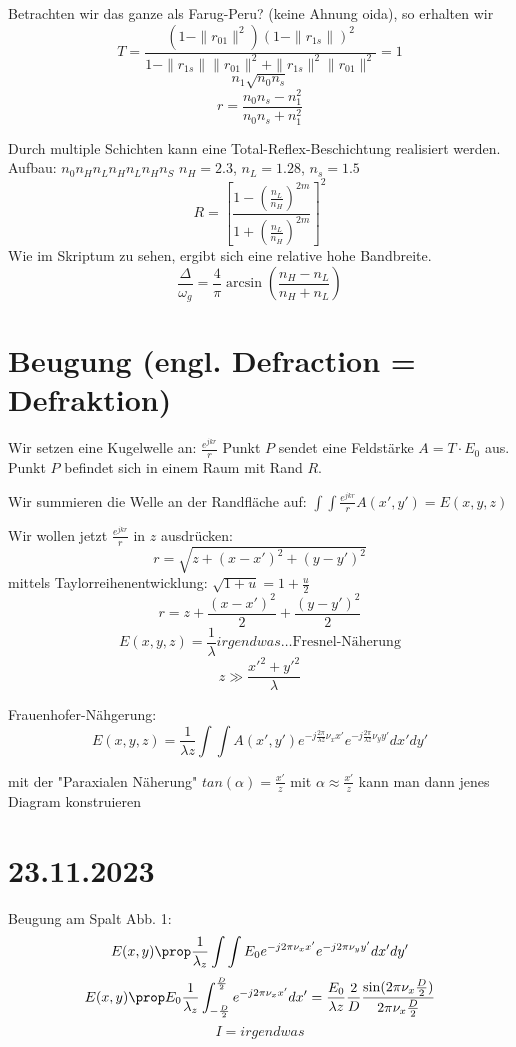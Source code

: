 \documentclass[a4paper]{article}
\begin{document}
Betrachten wir das ganze als Farug-Peru? (keine Ahnung oida), so erhalten wir
\[ T=\frac{(1-\|r_{01}\|^{2})(1-\|r_{1s}\|)^{2}}{1-\|r_{1s}\|\|r_{01}\|^{2}+\|r_{1s}\|^{2}\|r_{01}\|^{2}}=1 \]
\[ n_{1}\sqrt{n_{0}n_{s}}  \]
\[ r=\frac{n_{0}n_{s}-n_{1}^{2}}{n_{0}n_{s}+n_{1}^{2}} \]

Durch multiple Schichten kann eine Total-Reflex-Beschichtung realisiert werden.
Aufbau: $n_{0}n_{H}n_{L}n_{H}n_{L}n_{H}n_{S}$ 
$n_{H}=2.3$, $n_{L}=1.28$, $n_{s}=1.5$
\[ R=[\frac{1-(\frac{n_{L}}{n_{H}})^{2m}}{1+(\frac{n_{L}}{n_{H}})^{2m}}]^{2} \]
Wie im Skriptum zu sehen, ergibt sich eine relative hohe Bandbreite.
\[ \frac{\Delta}{\omega_{g}}=\frac{4}{\pi}\arcsin(\frac{n_{H}-n_{L}}{n_{H}+n_{L}}) \]

\section*{Beugung (engl. Defraction = Defraktion)}
Wir setzen eine Kugelwelle an: $\frac{e^{jkr}}{r}$ 
Punkt $P$ sendet eine Feldstärke $A=T\cdot E_{0}$ aus. Punkt $P$ befindet sich in einem Raum mit Rand  $R$.

Wir summieren die Welle an der Randfläche auf: $\int\int \frac{e^{jkr}}{r}A(x',y')=E(x,y,z)$

Wir wollen jetzt $\frac{e^{jkr}}{r}$ in $z$ ausdrücken:
\[ r=\sqrt{z +(x-x')^{2} + (y-y')^{2}} \]
mittels Taylorreihenentwicklung: $\sqrt{1+u}=1+\frac{u}{2} $
 \[ r=z+\frac{(x-x')^{2}}{2}+\frac{(y-y')^{2}}{2} \]
 \[ E(x,y,z)=\frac{1}{\lambda} irgendwas \text{\ldots Fresnel-Näherung} \]
\[ z\gg \frac{x'^{2}+y'^{2}}{\lambda} \]

Frauenhofer-Nähgerung:
\[ E(x,y,z)=\frac{1}{\lambda z} \int \int A(x',y')e^{-j \frac{2\pi}{\lambda z}\nu_{x} x'}e^{-j \frac{2\pi}{\lambda z}\nu_{y} y'} dx'dy' \]

mit der "Paraxialen Näherung" $tan(\alpha)=\frac{x'}{z}$ mit $\alpha \approx \frac{x'}{z}$ kann man dann jenes Diagram konstruieren

\section*{23.11.2023}
Beugung am Spalt Abb. 1:
\[ E(x,y)\prop \frac{1}{\lambda_{z}} \int\int E_{0}e^{-j2\pi\nu_{x}x'}e^{-j2\pi\nu_{y}y'}dx'dy'\]
\[ E(x,y)\prop E_{0}\frac{1}{\lambda_{z}} \int_{-\frac{D}{2}}^{\frac{D}{2}} e^{-j2\pi\nu_{x}x'}dx'=\frac{E_{0}}{\lambda z}\frac{2}{D}\frac{\sin(2\pi\nu_{x}\frac{D}{2})}{2\pi\nu_{x} \frac{D}{2}}  \]
\[ I=irgendwas\]
\end{document}
